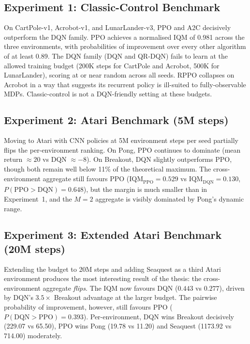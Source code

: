 \subsection{Experiment 1: Classic-Control Benchmark}

On CartPole-v1, Acrobot-v1, and LunarLander-v3, PPO and A2C decisively
outperform the DQN family. PPO achieves a normalised IQM of 0.981 across
the three environments, with probabilities of improvement over every
other algorithm of at least 0.89. The DQN family (DQN and QR-DQN) fails
to learn at the allowed training budget (200K steps for CartPole and
Acrobot, 500K for LunarLander), scoring at or near random across all
seeds. RPPO collapses on Acrobot in a way that suggests its recurrent
policy is ill-suited to fully-observable MDPs. Classic-control is not a
DQN-friendly setting at these budgets.

\subsection{Experiment 2: Atari Benchmark (5M steps)}

Moving to Atari with CNN policies at 5M environment steps per seed
partially flips the per-environment ranking. On Pong, PPO continues to
dominate (mean return $\approx 20$ vs DQN $\approx -8$). On Breakout,
DQN slightly outperforms PPO, though both remain well below 11\% of the
theoretical maximum. The cross-environment aggregate still favours PPO
($\text{IQM}_{\text{PPO}} = 0.529$ vs $\text{IQM}_{\text{DQN}} = 0.130$,
$P(\text{PPO} > \text{DQN}) = 0.648$), but the margin is much smaller
than in Experiment~1, and the $M=2$ aggregate is visibly dominated by
Pong's dynamic range.

\subsection{Experiment 3: Extended Atari Benchmark (20M steps)}

Extending the budget to 20M steps and adding Seaquest as a third Atari
environment produces the most interesting result of the thesis: the
cross-environment aggregate \emph{flips}. The IQM now favours DQN
($0.443$ vs $0.277$), driven by DQN's $3.5\times$ Breakout advantage at
the larger budget. The pairwise probability of improvement, however,
still favours PPO ($P(\text{DQN} > \text{PPO}) = 0.393$). Per-environment,
DQN wins Breakout decisively (229.07 vs 65.50), PPO wins Pong (19.78 vs
11.20) and Seaquest (1173.92 vs 714.00) moderately.

